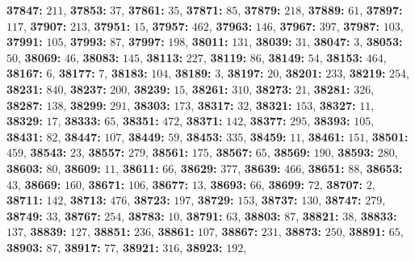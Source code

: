 \textsf{\bfseries 37847:} $211$, \textsf{\bfseries 37853:} $37$, \textsf{\bfseries 37861:} $35$, \textsf{\bfseries 37871:} $85$, \textsf{\bfseries 37879:} $218$, \textsf{\bfseries 37889:} $61$, \textsf{\bfseries 37897:} $117$, \textsf{\bfseries 37907:} $213$, \textsf{\bfseries 37951:} $15$, \textsf{\bfseries 37957:} $462$, \textsf{\bfseries 37963:} $146$, \textsf{\bfseries 37967:} $397$, \textsf{\bfseries 37987:} $103$, \textsf{\bfseries 37991:} $105$, \textsf{\bfseries 37993:} $87$, \textsf{\bfseries 37997:} $198$, \textsf{\bfseries 38011:} $131$, \textsf{\bfseries 38039:} $31$, \textsf{\bfseries 38047:} $3$, \textsf{\bfseries 38053:} $50$, \textsf{\bfseries 38069:} $46$, \textsf{\bfseries 38083:} $145$, \textsf{\bfseries 38113:} $227$, \textsf{\bfseries 38119:} $86$, \textsf{\bfseries 38149:} $54$, \textsf{\bfseries 38153:} $464$, \textsf{\bfseries 38167:} $6$, \textsf{\bfseries 38177:} $7$, \textsf{\bfseries 38183:} $104$, \textsf{\bfseries 38189:} $3$, \textsf{\bfseries 38197:} $20$, \textsf{\bfseries 38201:} $233$, \textsf{\bfseries 38219:} $254$, \textsf{\bfseries 38231:} $840$, \textsf{\bfseries 38237:} $200$, \textsf{\bfseries 38239:} $15$, \textsf{\bfseries 38261:} $310$, \textsf{\bfseries 38273:} $21$, \textsf{\bfseries 38281:} $326$, \textsf{\bfseries 38287:} $138$, \textsf{\bfseries 38299:} $291$, \textsf{\bfseries 38303:} $173$, \textsf{\bfseries 38317:} $32$, \textsf{\bfseries 38321:} $153$, \textsf{\bfseries 38327:} $11$, \textsf{\bfseries 38329:} $17$, \textsf{\bfseries 38333:} $65$, \textsf{\bfseries 38351:} $472$, \textsf{\bfseries 38371:} $142$, \textsf{\bfseries 38377:} $295$, \textsf{\bfseries 38393:} $105$, \textsf{\bfseries 38431:} $82$, \textsf{\bfseries 38447:} $107$, \textsf{\bfseries 38449:} $59$, \textsf{\bfseries 38453:} $335$, \textsf{\bfseries 38459:} $11$, \textsf{\bfseries 38461:} $151$, \textsf{\bfseries 38501:} $459$, \textsf{\bfseries 38543:} $23$, \textsf{\bfseries 38557:} $279$, \textsf{\bfseries 38561:} $175$, \textsf{\bfseries 38567:} $65$, \textsf{\bfseries 38569:} $190$, \textsf{\bfseries 38593:} $280$, \textsf{\bfseries 38603:} $80$, \textsf{\bfseries 38609:} $11$, \textsf{\bfseries 38611:} $66$, \textsf{\bfseries 38629:} $377$, \textsf{\bfseries 38639:} $466$, \textsf{\bfseries 38651:} $88$, \textsf{\bfseries 38653:} $43$, \textsf{\bfseries 38669:} $160$, \textsf{\bfseries 38671:} $106$, \textsf{\bfseries 38677:} $13$, \textsf{\bfseries 38693:} $66$, \textsf{\bfseries 38699:} $72$, \textsf{\bfseries 38707:} $2$, \textsf{\bfseries 38711:} $142$, \textsf{\bfseries 38713:} $476$, \textsf{\bfseries 38723:} $197$, \textsf{\bfseries 38729:} $153$, \textsf{\bfseries 38737:} $130$, \textsf{\bfseries 38747:} $279$, \textsf{\bfseries 38749:} $33$, \textsf{\bfseries 38767:} $254$, \textsf{\bfseries 38783:} $10$, \textsf{\bfseries 38791:} $63$, \textsf{\bfseries 38803:} $87$, \textsf{\bfseries 38821:} $38$, \textsf{\bfseries 38833:} $137$, \textsf{\bfseries 38839:} $127$, \textsf{\bfseries 38851:} $236$, \textsf{\bfseries 38861:} $107$, \textsf{\bfseries 38867:} $231$, \textsf{\bfseries 38873:} $250$, \textsf{\bfseries 38891:} $65$, \textsf{\bfseries 38903:} $87$, \textsf{\bfseries 38917:} $77$, \textsf{\bfseries 38921:} $316$, \textsf{\bfseries 38923:} $192$, 
